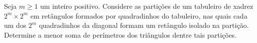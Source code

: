 Seja $m\geq 1$ um inteiro positivo. Considere as partições de um tabuleiro de xadrez $2^m\times 2^m$ em retângulos formados por quadradinhos do tabuleiro, nas quais cada um dos $2^m$ quadradinhos da diagonal formam um retângulo isolado na partição. Determine a menor soma de perímetros dos triângulos dentre tais partições.

